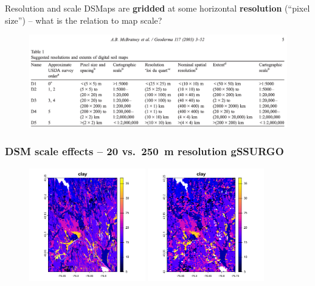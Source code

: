 \documentclass[aspectratio=169, 10pt]{beamer}
\begin{document}
\begin{frame}{Resolution and scale}
DSMaps are \textbf{gridded} at some horizontal \textbf{resolution} (``pixel size'') -- what is the relation to map scale?
\\[2ex]
    \begin{figure}
    \centering
\includegraphics[width=\textwidth]{./graphics_david/McBratney2013_Table1.png}
\end{figure}
\end{frame}

\begin{frame}
  \frametitle{DSM scale effects -- 20 vs.\ 250~m resolution gSSURGO}
    \begin{figure}
    \centering
\includegraphics[width=0.45\textwidth]{./graphics_david/ClydeNY_gSSURGO_20.png}
\hfill
\includegraphics[width=0.45\textwidth]{./graphics_david/ClydeNY_gSSURGO_250.png}
\end{figure}  
\end{frame}
\end{document}
